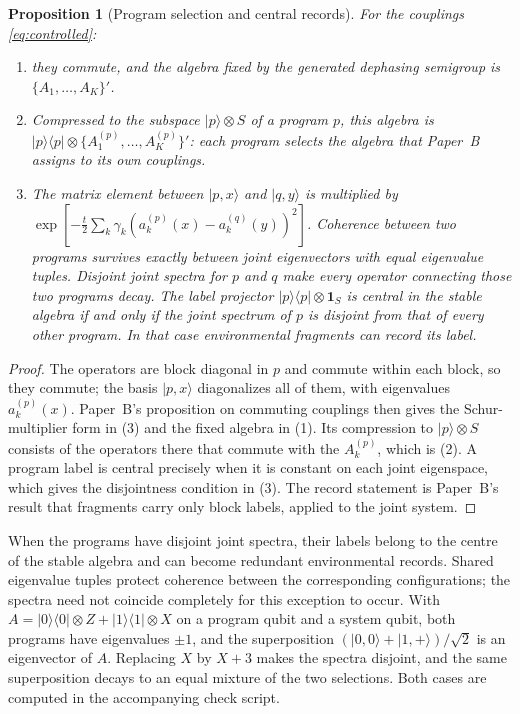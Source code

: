\documentclass[12pt,a4paper]{article}
\newtheorem{proposition}[theorem]{Proposition}
\newcommand{\ket}[1]{|#1\rangle}
\newcommand{\proj}[1]{|#1\rangle\!\langle #1|}
\begin{document}
\begin{proposition}[Program selection and central records]
\label{prop:own}
For the couplings \eqref{eq:controlled}:
\begin{enumerate}
\item they commute, and the algebra fixed by the generated dephasing semigroup is $\{A_1,\dots,A_K\}'$.
\item Compressed to the subspace $\ket p\otimes S$ of a program $p$, this algebra is $\proj p\otimes\{A_1^{(p)},\dots,A_K^{(p)}\}'$: each program selects the algebra that Paper~B assigns to its own couplings.
\item The matrix element between $\ket{p,x}$ and $\ket{q,y}$ is multiplied by $\exp[-\frac t2\sum_k\gamma_k(a_k^{(p)}(x)-a_k^{(q)}(y))^2]$. Coherence between two programs survives exactly between joint eigenvectors with equal eigenvalue tuples. Disjoint joint spectra for $p$ and $q$ make every operator connecting those two programs decay. The label projector $\proj p\otimes\mathbf 1_S$ is central in the stable algebra if and only if the joint spectrum of $p$ is disjoint from that of every other program. In that case environmental fragments can record its label.
\end{enumerate}
\end{proposition}

\begin{proof}
The operators are block diagonal in $p$ and commute within each block, so they commute; the basis $\ket{p,x}$ diagonalizes all of them, with eigenvalues $a_k^{(p)}(x)$. Paper~B's proposition on commuting couplings then gives the Schur-multiplier form in (3) and the fixed algebra in (1). Its compression to $\ket p\otimes S$ consists of the operators there that commute with the $A_k^{(p)}$, which is (2). A program label is central precisely when it is constant on each joint eigenspace, which gives the disjointness condition in (3). The record statement is Paper~B's result that fragments carry only block labels, applied to the joint system.
\end{proof}

When the programs have disjoint joint spectra, their labels belong to the centre of the stable algebra and can become redundant environmental records. Shared eigenvalue tuples protect coherence between the corresponding configurations; the spectra need not coincide completely for this exception to occur. With $A=\proj0\otimes Z+\proj1\otimes X$ on a program qubit and a system qubit, both programs have eigenvalues $\pm1$, and the superposition $(\ket{0,0}+\ket{1,+})/\sqrt2$ is an eigenvector of $A$. Replacing $X$ by $X+3$ makes the spectra disjoint, and the same superposition decays to an equal mixture of the two selections. Both cases are computed in the accompanying check script.
\end{document}
